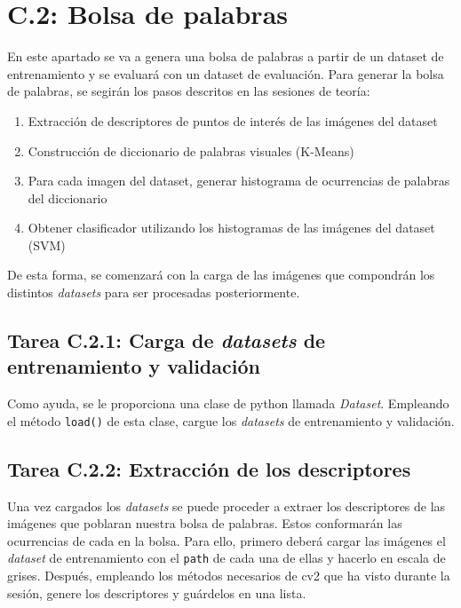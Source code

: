 \section*{C.2: Bolsa de palabras}
{}

En este apartado se va a genera una bolsa de palabras a partir de un dataset de entrenamiento y se evaluará con un dataset de evaluación. Para generar la bolsa de palabras, se segirán los pasos descritos en las sesiones de teoría:

\begin{enumerate}
    \item Extracción de descriptores de puntos de interés de las imágenes del dataset
    \item Construcción de diccionario de palabras visuales (K-Means)
    \item Para cada imagen del dataset, generar histograma de ocurrencias de palabras del diccionario
    \item Obtener clasificador utilizando los histogramas de las imágenes del dataset (SVM)
\end{enumerate}

De esta forma, se comenzará con la carga de las imágenes que compondrán los distintos \textit{datasets} para ser procesadas posteriormente.

\subsection*{Tarea C.2.1: Carga de \textit{datasets} de entrenamiento y validación}

Como ayuda, se le proporciona una clase de python llamada \textit{Dataset}. Empleando el método \texttt{load()} de esta clase, cargue los \textit{datasets} de entrenamiento y validación.

\subsection*{Tarea C.2.2: Extracción de los descriptores}

Una vez cargados los \textit{datasets} se puede proceder a extraer los descriptores de las imágenes que poblaran nuestra bolsa de palabras. Estos conformarán las ocurrencias de cada en la bolsa. Para ello, primero deberá cargar las imágenes el \textit{dataset} de entrenamiento con el \texttt{path} de cada una de ellas y hacerlo en escala de grises. Después, empleando los métodos necesarios de cv2 que ha visto durante la sesión, genere los descriptores y guárdelos en una lista.

